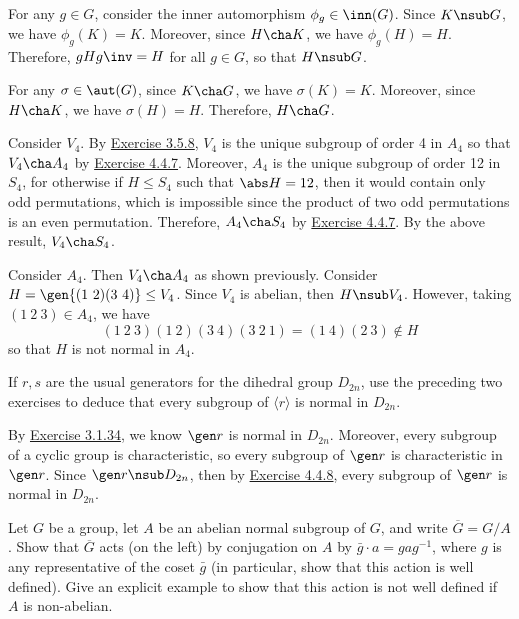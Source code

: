 \begin{solalph}
	\item For any $g \in G$, consider the inner automorphism $\phi_g \in \inn(G)$. Since $K \nsub G$, we have $\phi_g(K) = K$. Moreover, since $H \cha K$, we have $\phi_g(H) = H$. Therefore, $gHg\inv = H$ for all $g \in G$, so that $H \nsub G$.
	\item For any $\sigma \in \aut(G)$, since $K \cha G$, we have $\sigma(K) = K$. Moreover, since $H \cha K$, we have $\sigma(H) = H$. Therefore, $H \cha G$. 
	
	Consider $V_4$. By \hyperref[ex3.5.8]{Exercise 3.5.8}, $V_4$ is the unique subgroup of order 4 in $A_4$ so that $V_4 \cha A_4$ by \hyperref[ex4.4.7]{Exercise 4.4.7}. Moreover, $A_4$ is the unique subgroup of order 12 in $S_4$, for otherwise if $H \leq S_4$ such that $\abs H = 12$, then it would contain only odd permutations, which is impossible since the product of two odd permutations is an even permutation. Therefore, $A_4 \cha S_4$ by \hyperref[ex4.4.7]{Exercise 4.4.7}. By the above result, $V_4 \cha S_4$.
	\item Consider $A_4$. Then $V_4 \cha A_4$ as shown previously. Consider $H = \gen{(1\ 2)(3\ 4)} \leq V_4$. Since $V_4$ is abelian, then $H \nsub V_4$. However, taking $(1\ 2\ 3) \in A_4$, we have
	\[(1\ 2\ 3)(1\ 2)(3\ 4)(3\ 2\ 1) = (1\ 4)(2\ 3) \not\in H\]
	so that $H$ is not normal in $A_4$.
\end{solalph}

\begin{exercise}
	If $r,s$ are the usual generators for the dihedral group $D_{2n}$, use the preceding two exercises to deduce that every subgroup of $\langle r\rangle$ is normal in $D_{2n}$.
\end{exercise}

\begin{sol}
	By \hyperref[ex3.1.34]{Exercise 3.1.34}, we know $\gen r$ is normal in $D_{2n}$. Moreover, every subgroup of a cyclic group is characteristic, so every subgroup of $\gen r$ is characteristic in $\gen r$. Since $\gen r \nsub D_{2n}$, then by \hyperref[ex4.4.8]{Exercise 4.4.8}, every subgroup of $\gen r$ is normal in $D_{2n}$.
\end{sol}

\begin{exercise}
	Let $G$ be a group, let $A$ be an abelian normal subgroup of $G$, and write $\overline{G}=G/A$. Show that $\overline{G}$ acts (on the left) by conjugation on $A$ by $\bar g \cdot a = gag^{-1}$, where $g$ is any representative of the coset $\bar g$ (in particular, show that this action is well defined). Give an explicit example to show that this action is not well defined if $A$ is non-abelian.
\end{exercise}

